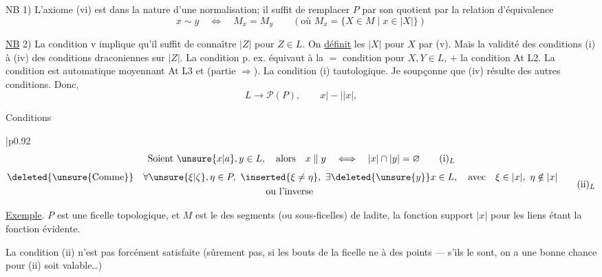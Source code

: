 NB 1) L'axiome (vi) est dans la nature d'une normalisation; il suffit de remplacer $P$ par son quotient par la relation d'équivalence
\[
x\sim y\quad\Longleftrightarrow\quad M_x=M_y
\qquad (\text{où }M_x=\{X\in M\mid x\in|X|\})
\]

\uline{NB} 2) La condition v implique qu'il suffit de connaître $|Z|$ pour $Z\in L$.  On \uline{définit} les $|X|$ pour $X$  par (v). Mais la validité des conditions (i) à (iv)  des conditions draconiennes sur $|Z|$. La condition  p. ex. équivaut à la $=$ condition  pour $X,Y\in L$, $+$ la condition At L2. La condition   est automatique moyennant At L3 et  (partie $\Rightarrow$). La condition (i) tautologique. Je soupçonne que (iv) résulte des autres conditions. Donc,   
\[
L\longrightarrow\mathcal{P}(P),\qquad
x\mathrel{\vert\!{-}\!\vert}|x|,
\]

Conditions
\begin{tabular}{|p{0.92\linewidth}}
\[
\text{Soient }\unsure{x|a},y\in L,\quad\text{alors}\quad
x\parallel y\quad\Longleftrightarrow\quad |x|\cap|y|=\varnothing
\tag*{$(\mathrm{i})_L$}
\]
\[
\begin{aligned}
&\deleted{\text{\unsure{Comme}}}\quad\forall\unsure{\xi|\zeta},\eta\in P,
\ \inserted{\xi\ne\eta},\ \exists\deleted{\unsure{y}}x\in L,\quad\text{avec}\quad
\xi\in|x|,\ \eta\notin|x|\\
&\hspace{27em}\text{ou l'inverse}
\end{aligned}
\tag*{$(\mathrm{ii})_L$}
\]

\end{tabular}

\uline{Exemple}. $P$ est une ficelle topologique,  et $M$ est le  des  segments (ou sous-ficelles) de ladite, la fonction support $|x|$  pour les liens étant la fonction évidente.

La condition (ii) n'est pas forcément satisfaite (sûrement pas, si les bouts de la ficelle ne   à des points --- s'ils le sont, on a une bonne chance pour (ii) soit valable\ldots)

